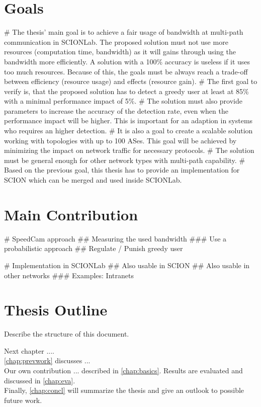 \documentclass[thesis.tex]{subfiles}
\begin{document}
\section{Goals} \label{sec:intro:goals}
     \begin{easylist}
        \MyNumberedListProperties
        # The thesis' main goal is to achieve a fair usage of bandwidth at multi-path communication in SCIONLab. The proposed solution must not use more resources (computation time, bandwidth) as it will gains through using the bandwidth more efficiently. A solution with a 100\% accuracy is useless if it uses too much resources. Because of this, the goals must be always reach a trade-off between efficiency (resource usage) and effects (resource gain).        
        # The first goal to verify is, that the proposed solution has to detect a greedy user at least at 85\% with a minimal performance impact of 5\%.         
        # The solution must also provide parameters to increase the accuracy of the detection rate, even when the performance impact will be higher. This is important for an adaption in systems who requires an higher detection.
        # It is also a goal to create a scalable solution working with topologies with up to 100 ASes. This goal will be achieved by minimizing the impact on network traffic for necessary protocols.        
        # The solution must be general enough for other network types with multi-path capability.        
        # Based on the previous goal, this thesis has to provide an implementation for SCION which can be merged and used inside SCIONLab.
    \end{easylist}

\section{Main Contribution}
    \begin{easylist}
        \MyListProperties
        # SpeedCam approach
        ## Measuring the used bandwidth
        ### Use a probabilistic approach 
        ## Regulate  / Punish greedy user
        
        # Implementation in SCIONLab
        ## Also usable in SCION
        ## Also usable in other networks
        ### Examples: Intranets 
    \end{easylist}
\section{Thesis Outline}
Describe the structure of this document.

Next chapter ....
\\
\autoref{chap:prevwork} discusses ...
\\
Our own contribution ... described in \autoref{chap:basics}.
Results are evaluated and discussed in \autoref{chap:eva}.
\\
Finally, \autoref{chap:concl} will summarize the thesis and give an outlook to possible future work.

\subfilebib %
\end{document}
